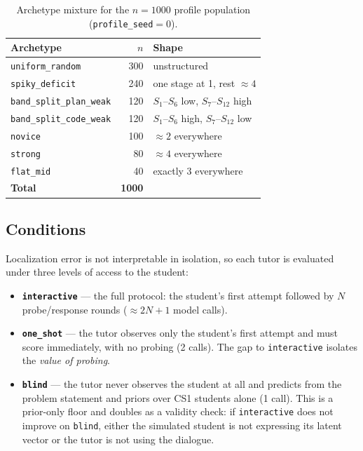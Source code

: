 \begin{table}[t]
\centering
\small
\begin{tabular}{@{}lrp{3.5cm}@{}}
\toprule
\textbf{Archetype} & \textbf{$n$} & \textbf{Shape} \\
\midrule
\texttt{uniform\_random}        & 300 & unstructured \\
\texttt{spiky\_deficit}         & 240 & one stage at 1, rest $\approx 4$ \\
\texttt{band\_split\_plan\_weak}& 120 & $S_1$--$S_6$ low, $S_7$--$S_{12}$ high \\
\texttt{band\_split\_code\_weak}& 120 & $S_1$--$S_6$ high, $S_7$--$S_{12}$ low \\
\texttt{novice}                 & 100 & $\approx 2$ everywhere \\
\texttt{strong}                 &  80 & $\approx 4$ everywhere \\
\texttt{flat\_mid}              &  40 & exactly 3 everywhere \\
\midrule
\textbf{Total}                  & \textbf{1000} & \\
\bottomrule
\end{tabular}
\caption{Archetype mixture for the $n{=}1000$ profile population
(\texttt{profile\_seed}$=0$).}
\label{tab:archetypes}
\end{table}

\subsection{Conditions}
\label{app:conditions}

Localization error is not interpretable in isolation, so each tutor is
evaluated under three levels of access to the student:

\begin{itemize}
\itemsep0em
\item \textbf{\texttt{interactive}} --- the full protocol: the student's first
attempt followed by $N$ probe/response rounds ($\approx 2N{+}1$ model calls).
\item \textbf{\texttt{one\_shot}} --- the tutor observes only the student's
first attempt and must score immediately, with no probing (2 calls). The gap
to \texttt{interactive} isolates the \emph{value of probing}.
\item \textbf{\texttt{blind}} --- the tutor never observes the student at all
and predicts from the problem statement and priors over CS1 students alone
(1 call). This is a prior-only floor and doubles as a validity check: if
\texttt{interactive} does not improve on \texttt{blind}, either the simulated
student is not expressing its latent vector or the tutor is not using the
dialogue.
\end{itemize}

